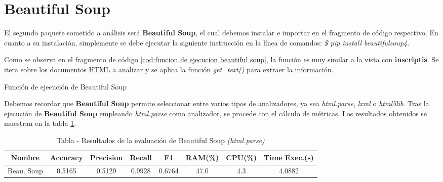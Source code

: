 \section*{Beautiful Soup}

El segundo paquete sometido a análisis será \textbf{Beautiful Soup}, el cual debemos instalar e importar 
en el fragmento de código respectivo. En cuanto a su instalación, simplemente se debe ejecutar la siguiente 
instrucción en la línea de comandos: \emph{\$ pip install beautifulsoup4}.

Como se observa en el fragmento de código \ref{cod:funcion de ejecucion beautiful soup}, la función es muy
similar a la vista con \textbf{inscriptis}. Se itera sobre los documentos HTML a analizar y se aplica la
función \emph{get\_text()} para extraer la información.

\begin{codefloat}
    
    \caption{Función de ejecución de Beautiful Soup}
    \label{cod:funcion de ejecucion beautiful soup}
\end{codefloat}

Debemos recordar que \textbf{Beautiful Soup} permite seleccionar entre varios tipos de analizadores, ya sea
\emph{html.parse}, \emph{lxml} o \emph{html5lib}. Tras la ejecución de \textbf{Beautiful Soup} empleando
\emph{html.parse} como analizador, se procede con el cálculo de métricas. Los resultados obtenidos se 
muestran en la tabla \ref{tab:tabla - resultados de la evaluacion de beautiful soup html.parse}.

\begin{table}[h]
    \begin{center}
      \begin{tabular}{| c | c | c | c | c | c | c | c |} \hline 
       \textbf{Nombre} & \textbf{Accuracy} & \textbf{Precision}  & \textbf{Recall} & \textbf{F1} & \textbf{RAM(\%)} & \textbf{CPU(\%)} & \textbf{Time Exec.(s)} \\ \hline
       Beau. Soup & 0.5165 & 0.5129 & 0.9928 & 0.6764 & 47.0 & 4.3 & 4.0882 \\ \hline
      \end{tabular}
      \caption{Tabla - Resultados de la evaluación de Beautiful Soup \emph{(html.parse)}}
      \label{tab:tabla - resultados de la evaluacion de beautiful soup html.parse}
    \end{center}
\end{table} 

